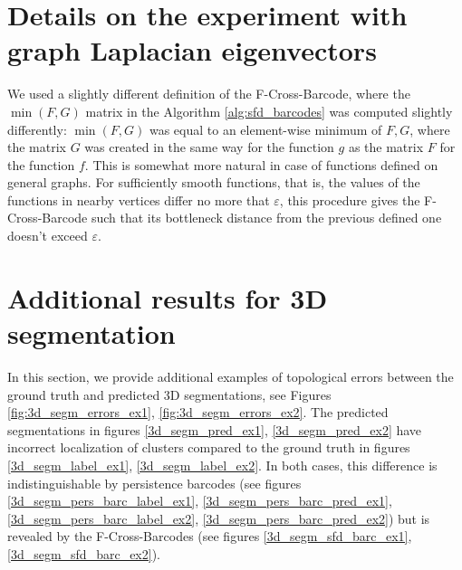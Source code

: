 \documentclass[runningheads]{llncs}
\begin{document}

\section{Details on the experiment with graph Laplacian eigenvectors}

We used a slightly different definition of the F-Cross-Barcode, where the $\min(F,G)$ matrix in the Algorithm \ref{alg:sfd_barcodes} was computed slightly differently: 
$\min(F,G)$ was equal to an element-wise minimum of $F, G$, where the matrix $G$ was created in the same way for the function $g$ as the matrix $F$ for the function $f$.
This is somewhat more natural in case of functions defined on general graphs. For sufficiently smooth functions, that is, the values of the functions in nearby vertices differ no more that $\varepsilon$, this procedure gives the F-Cross-Barcode such that its bottleneck distance from the previous defined one doesn't exceed $\varepsilon$.


\section{Additional results for 3D segmentation}

In this section, we provide additional examples of topological errors between the ground truth and predicted 3D segmentations, see Figures \ref{fig:3d_segm_errors_ex1}, \ref{fig:3d_segm_errors_ex2}. The predicted segmentations in figures \ref{3d_segm_pred_ex1}, \ref{3d_segm_pred_ex2} have incorrect localization of clusters compared to the ground truth in figures \ref{3d_segm_label_ex1}, \ref{3d_segm_label_ex2}. In both cases, this difference is indistinguishable by persistence barcodes (see figures \ref{3d_segm_pers_barc_label_ex1}, \ref{3d_segm_pers_barc_pred_ex1}, \ref{3d_segm_pers_barc_label_ex2}, \ref{3d_segm_pers_barc_pred_ex2}) but is revealed by the F-Cross-Barcodes (see figures \ref{3d_segm_sfd_barc_ex1}, \ref{3d_segm_sfd_barc_ex2}).
\end{document}
